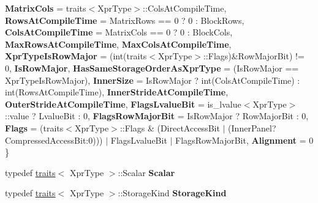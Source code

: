 \begin{DoxyCompactItemize}
{\bfseries Matrix\+Cols} = traits$<$Xpr\+Type$>$\+:\+:Cols\+At\+Compile\+Time, 
{\bfseries Rows\+At\+Compile\+Time} = Matrix\+Rows == 0 ? 0 \+: Block\+Rows, 
{\bfseries Cols\+At\+Compile\+Time} = Matrix\+Cols == 0 ? 0 \+: Block\+Cols, 
\newline
{\bfseries Max\+Rows\+At\+Compile\+Time}, 
{\bfseries Max\+Cols\+At\+Compile\+Time}, 
{\bfseries Xpr\+Type\+Is\+Row\+Major} = (int(traits$<$Xpr\+Type$>$\+:\+:Flags)\&Row\+Major\+Bit) != 0, 
{\bfseries Is\+Row\+Major}, 
\newline
{\bfseries Has\+Same\+Storage\+Order\+As\+Xpr\+Type} = (Is\+Row\+Major == Xpr\+Type\+Is\+Row\+Major), 
{\bfseries Inner\+Size} = Is\+Row\+Major ? int(Cols\+At\+Compile\+Time) \+: int(Rows\+At\+Compile\+Time), 
{\bfseries Inner\+Stride\+At\+Compile\+Time}, 
{\bfseries Outer\+Stride\+At\+Compile\+Time}, 
\newline
{\bfseries Flags\+Lvalue\+Bit} = is\+\_\+lvalue$<$Xpr\+Type$>$\+:\+:value ? Lvalue\+Bit \+: 0, 
{\bfseries Flags\+Row\+Major\+Bit} = Is\+Row\+Major ? Row\+Major\+Bit \+: 0, 
{\bfseries Flags} = (traits$<$Xpr\+Type$>$\+:\+:Flags \& (Direct\+Access\+Bit $\vert$ (Inner\+Panel?Compressed\+Access\+Bit\+:0))) $\vert$ Flags\+Lvalue\+Bit $\vert$ Flags\+Row\+Major\+Bit, 
{\bfseries Alignment} = 0
 \}
\item 
\mbox{\label{struct_eigen_1_1internal_1_1traits_3_01_block_3_01_xpr_type_00_01_block_rows_00_01_block_cols_00_01_inner_panel_01_4_01_4_a8a33b6df13c733f1d38a16c74bbb864d}} 
typedef \hyperlink{struct_eigen_1_1internal_1_1traits}{traits}$<$ Xpr\+Type $>$\+::Scalar {\bfseries Scalar}
\item 
\mbox{\label{struct_eigen_1_1internal_1_1traits_3_01_block_3_01_xpr_type_00_01_block_rows_00_01_block_cols_00_01_inner_panel_01_4_01_4_af2e9a400c76d70f917abdfa04c5371a5}} 
typedef \hyperlink{struct_eigen_1_1internal_1_1traits}{traits}$<$ Xpr\+Type $>$\+::Storage\+Kind {\bfseries Storage\+Kind}
\item 
\mbox{\label{struct_eigen_1_1internal_1_1traits_3_01_block_3_01_xpr_type_00_01_block_rows_00_01_block_cols_00_01_inner_panel_01_4_01_4_a76b0ec4ddba72481429a9b4a9b259409}} 

\end{DoxyCompactItemize}
